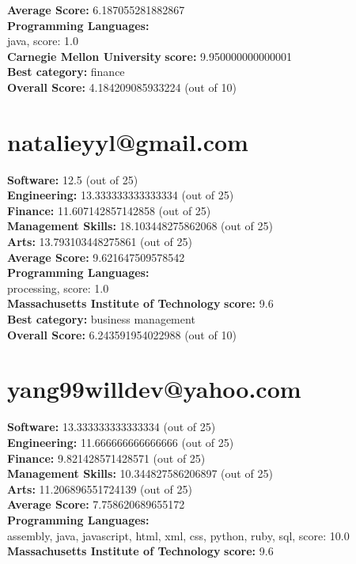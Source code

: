 \documentclass{article}
\begin{document}
\textbf{Average Score: } 6.187055281882867\\
\textbf{Programming Languages:} \\
java, score: 1.0\\
\textbf{Carnegie Mellon University} \textbf{score:} 9.950000000000001\\
\textbf{Best category: } finance\\
\textbf{Overall Score: }4.184209085933224 (out of 10)\section{natalieyyl@gmail.com}
\textbf{Software:} 12.5 (out of 25)\\
\textbf{Engineering: } 13.333333333333334 (out of 25)\\
\textbf{Finance:} 11.607142857142858 (out of 25)\\
\textbf{Management Skills:} 18.103448275862068 (out of 25)\\
\textbf{Arts:} 13.793103448275861 (out of 25)\\
\textbf{Average Score: } 9.621647509578542\\
\textbf{Programming Languages:} \\
processing, score: 1.0\\
\textbf{Massachusetts Institute of Technology} \textbf{score:} 9.6\\
\textbf{Best category: } business management\\
\textbf{Overall Score: }6.243591954022988 (out of 10)\section{yang99willdev@yahoo.com}
\textbf{Software:} 13.333333333333334 (out of 25)\\
\textbf{Engineering: } 11.666666666666666 (out of 25)\\
\textbf{Finance:} 9.821428571428571 (out of 25)\\
\textbf{Management Skills:} 10.344827586206897 (out of 25)\\
\textbf{Arts:} 11.206896551724139 (out of 25)\\
\textbf{Average Score: } 7.758620689655172\\
\textbf{Programming Languages:} \\
assembly, java, javascript, html, xml, css, python, ruby, sql, score: 10.0\\
\textbf{Massachusetts Institute of Technology} \textbf{score:} 9.6\\
\end{document}

